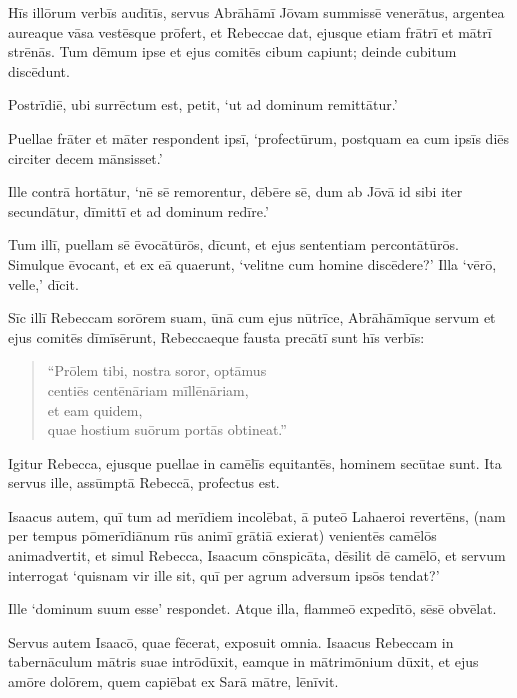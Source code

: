 \Versus Hīs illōrum verbīs audītīs, servus Abrāhāmī Jōvam summissē venerātus,
\Versus argentea aureaque vāsa vestēsque prōfert, et Rebeccae dat, ejusque etiam frātrī et mātrī strēnās.
\Versus Tum dēmum ipse et ejus comitēs cibum capiunt; deinde cubitum discēdunt.

Postrīdiē, ubi surrēctum est, petit, `ut ad dominum remittātur.'

\Versus Puellae frāter et māter respondent ipsī, `profectūrum, postquam ea cum ipsīs diēs circiter decem mānsisset.'

\Versus Ille contrā hortātur, `nē sē remorentur, dēbēre sē, dum ab Jōvā id sibi iter secundātur, dīmittī et ad dominum redīre.'

\Versus Tum illī, puellam sē ēvocātūrōs, dīcunt, et ejus sententiam percontātūrōs.
\Versus Simulque ēvocant, et ex eā quaerunt, `velitne cum homine discēdere?' Illa `vērō, velle,' dīcit.

\Versus Sīc illī Rebeccam sorōrem suam, ūnā cum ejus nūtrīce, Abrāhāmīque servum et ejus comitēs dīmīsērunt,
\Versus Rebeccaeque fausta precātī sunt hīs verbīs:

\begin{verse}
\begin{patverse*}
 ``Prōlem tibi, nostra soror, optāmus\\
 centiēs centēnāriam mīllēnāriam,\\
 et eam quidem,\\
 quae hostium suōrum portās obtineat.''
\end{patverse*}
\end{verse}

\Versus Igitur Rebecca, ejusque puellae in camēlīs equitantēs, hominem secūtae sunt. Ita servus ille, assūmptā Rebeccā, profectus est.

\Versus Isaacus autem, quī tum ad merīdiem incolēbat, ā puteō Lahaeroi revertēns,
\Versus (nam per tempus pōmerīdiānum rūs animī grātiā exierat) venientēs camēlōs animadvertit,
\Versus et simul Rebecca, Isaacum cōnspicāta, dēsilit dē camēlō,
\Versus et servum interrogat `quisnam vir ille sit, quī per agrum adversum ipsōs tendat?'

Ille `dominum suum esse' respondet. Atque illa, flammeō expedītō, sēsē obvēlat.

\Versus Servus autem Isaacō, quae fēcerat, exposuit omnia.
\Versus Isaacus Rebeccam in tabernāculum mātris suae intrōdūxit, eamque in mātrimōnium dūxit,
\Versus et ejus amōre dolōrem, quem capiēbat ex Sarā mātre, lēnīvit.



